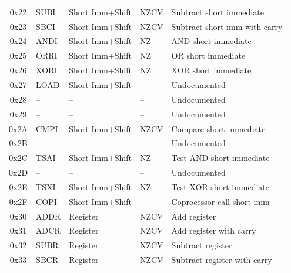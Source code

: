 \begin{table}[H]
\begin{tabular}{clllp{4cm}}
		0x22            & SUBI              & Short Imm+Shift & NZCV           & Subtract short immediate      \\
		0x23            & SBCI              & Short Imm+Shift & NZCV           & Subtract short imm with carry \\
		0x24            & ANDI              & Short Imm+Shift & NZ             & AND short immediate           \\
		0x25            & ORRI              & Short Imm+Shift & NZ             & OR short immediate            \\
		0x26            & XORI              & Short Imm+Shift & NZ             & XOR short immediate           \\
		0x27            & LOAD              & Short Imm+Shift & --             & Undocumented				   \\
		0x28            & --                & --              & --             & Undocumented                  \\
		0x29            & --                & --              & --             & Undocumented                  \\
		0x2A            & CMPI              & Short Imm+Shift & NZCV           & Compare short immediate       \\
		0x2B            & --                & --              & --             & Undocumented                  \\
		0x2C            & TSAI              & Short Imm+Shift & NZ             & Test AND short immediate      \\
		0x2D            & --                & --              & --             & Undocumented                  \\
		0x2E            & TSXI              & Short Imm+Shift & NZ             & Test XOR short immediate      \\
		0x2F            & COPI              & Short Imm+Shift & --             & Coprocessor call short imm    \\
		\midrule
		0x30            & ADDR              & Register        & NZCV           & Add register                  \\
		0x31            & ADCR              & Register        & NZCV           & Add register with carry       \\
		0x32            & SUBR              & Register        & NZCV           & Subtract register             \\
		0x33            & SBCR              & Register        & NZCV           & Subtract register with carry  \\

\end{tabular}
\end{table}
